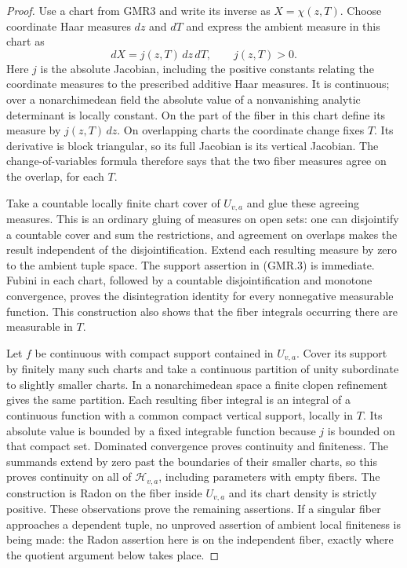 \documentclass[11pt,a4paper]{article}
\numberwithin{equation}{section}
\theoremstyle{remark}\newtheorem{remark}[theorem]{Remark}
\begin{document}
\begin{proof}
Use a chart from GMR3 and write its inverse as $X=\chi(z,T)$.
Choose coordinate Haar measures $dz$ and $dT$ and express the ambient
measure in this chart as
\[
 dX=j(z,T)\,dz\,dT,\qquad j(z,T)>0.
 \tag{GMR.9}
\]
Here $j$ is the absolute Jacobian, including the positive constants
relating the coordinate measures to the prescribed additive Haar
measures.  It is continuous; over a nonarchimedean field the absolute
value of a nonvanishing analytic determinant is locally constant.
On the part of the fiber in this chart define its measure by
$j(z,T)\,dz$.  On overlapping charts the coordinate change fixes $T$.
Its derivative is block triangular, so its full Jacobian is its
vertical Jacobian.  The change-of-variables formula therefore says
that the two fiber measures agree on the overlap, for each $T$.

Take a countable locally finite chart cover of $U_{v,a}$ and glue these
agreeing measures.  This is an ordinary gluing of measures on open
sets: one can disjointify a countable cover and sum the restrictions,
and agreement on overlaps makes the result independent of the
disjointification.  Extend each resulting measure by zero to the
ambient tuple space.  The support assertion in (GMR.3) is immediate.
Fubini in each chart, followed by a countable disjointification and
monotone convergence, proves the disintegration identity for every
nonnegative measurable function.  This construction also shows that
the fiber integrals occurring there are measurable in $T$.

Let $f$ be continuous with compact support contained in $U_{v,a}$.
Cover its support by finitely many such charts and take a continuous
partition of unity subordinate to slightly smaller charts.  In a
nonarchimedean space a finite clopen refinement gives the same
partition.  Each resulting fiber integral is an integral of a
continuous function with a common compact vertical support, locally
in $T$.  Its absolute value is bounded by a fixed integrable function
because $j$ is bounded on that compact set.  Dominated convergence
proves continuity and finiteness.  The summands extend by zero past
the boundaries of their smaller charts, so this proves continuity on
all of $\mathcal H_{v,a}$, including parameters with empty fibers.
The construction is Radon on the fiber inside $U_{v,a}$ and its chart
density is strictly positive.  These observations prove the remaining
assertions.  If a singular fiber approaches a dependent tuple, no
unproved assertion of ambient local finiteness is being made: the
Radon assertion here is on the independent fiber, exactly where the
quotient argument below takes place.
\end{proof}
\end{document}
